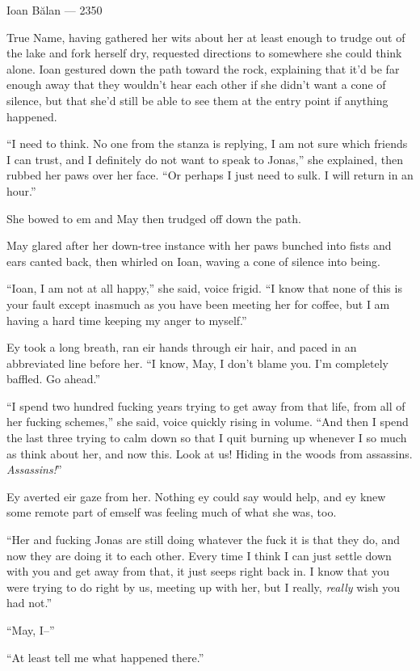 Ioan Bălan — 2350

True Name, having gathered her wits about her at least enough to trudge out of the lake and fork herself dry, requested directions to somewhere she could think alone. Ioan gestured down the path toward the rock, explaining that it'd be far enough away that they wouldn't hear each other if she didn't want a cone of silence, but that she'd still be able to see them at the entry point if anything happened.

``I need to think. No one from the stanza is replying, I am not sure which friends I can trust, and I definitely do not want to speak to Jonas,'' she explained, then rubbed her paws over her face. ``Or perhaps I just need to sulk. I will return in an hour.''

She bowed to em and May then trudged off down the path.

May glared after her down-tree instance with her paws bunched into fists and ears canted back, then whirled on Ioan, waving a cone of silence into being.

``Ioan, I am not at all happy,'' she said, voice frigid. ``I know that none of this is your fault except inasmuch as you have been meeting her for coffee, but I am having a hard time keeping my anger to myself.''

Ey took a long breath, ran eir hands through eir hair, and paced in an abbreviated line before her. ``I know, May, I don't blame you. I'm completely baffled. Go ahead.''

``I spend two hundred fucking years trying to get away from that life, from all of her fucking schemes,'' she said, voice quickly rising in volume. ``And then I spend the last three trying to calm down so that I quit burning up whenever I so much as think about her, and now this. Look at us! Hiding in the woods from assassins. \emph{Assassins!}''

Ey averted eir gaze from her. Nothing ey could say would help, and ey knew some remote part of emself was feeling much of what she was, too.

``Her and fucking Jonas are still doing whatever the fuck it is that they do, and now they are doing it to each other. Every time I think I can just settle down with you and get away from that, it just seeps right back in. I know that you were trying to do right by us, meeting up with her, but I really, \emph{really} wish you had not.''

``May, I--''

``At least tell me what happened there.''


